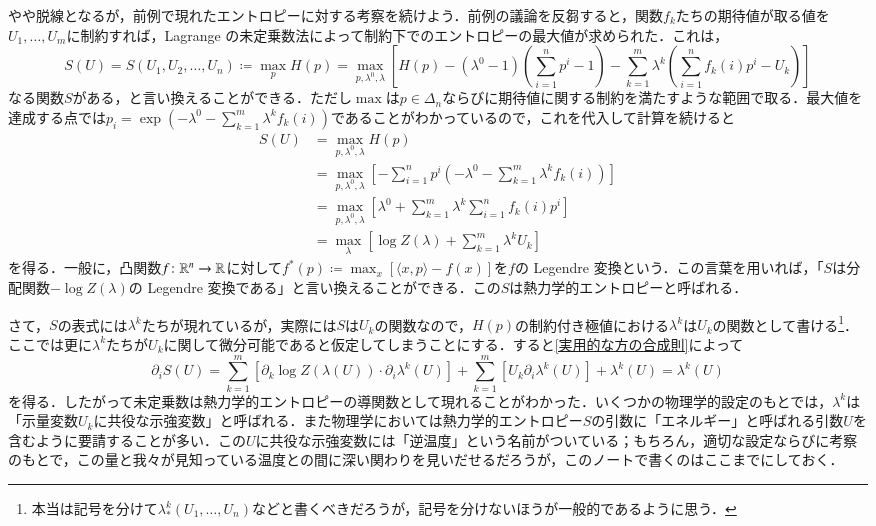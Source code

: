 \begin{exm}
やや脱線となるが，前例で現れたエントロピーに対する考察を続けよう．前例の議論を反芻すると，関数$f_k$たちの期待値が取る値を$U_1, \dots, U_m$に制約すれば，Lagrange の未定乗数法によって制約下でのエントロピーの最大値が求められた．これは，
\begin{equation}
S(U) = S(U_1, U_2, \dots, U_n) \coloneqq \max_{p} H(p) = \max_{p, \lambda^0, \lambda} \left[H(p) - (\lambda^0-1) \left(\sum_{i=1}^n p^i - 1\right) - \sum_{k=1}^m \lambda^k \left(\sum_{i=1}^n f_k(i) p^i - U_k\right) \right]
\end{equation}なる関数$S$がある，と言い換えることができる．ただし$\max$は$p\in \Delta_n$ならびに期待値に関する制約を満たすような範囲で取る．最大値を達成する点では$p_i = \exp\left(- \lambda^0 - \sum_{k=1}^m \lambda^k f_k(i) \right)$であることがわかっているので，これを代入して計算を続けると
\begin{align}
S(U) &= \max_{p,\lambda^0,\lambda} H(p) \\
&= \max_{p, \lambda^0, \lambda} \left[ -\sum_{i=1}^n p^i \left(-\lambda^0 - \sum_{k=1}^m \lambda^k f_k(i) \right) \right] \\
&= \max_{p, \lambda^0, \lambda} \left[ \lambda^0 + \sum_{k=1}^m \lambda^k \sum_{i=1}^n f_k(i)p^i  \right] \\
&= \max_{\lambda} \left[ \log Z(\lambda) + \sum_{k=1}^m \lambda^k  U_k  \right]
\end{align}を得る．一般に，凸関数$f \colon \mathbb{R}^n \to \mathbb{R}$に対して$f^*(p) \coloneqq \max_x \left[ \langle x,p \rangle - f(x) \right]$を$f$の Legendre 変換という．この言葉を用いれば，「$S$は分配関数$-\log Z(\lambda)$の Legendre 変換である」と言い換えることができる．この$S$は熱力学的エントロピーと呼ばれる．

さて，$S$の表式には$\lambda^k$たちが現れているが，実際には$S$は$U_k$の関数なので，$H(p)$の制約付き極値における$\lambda^k$は$U_k$の関数として書ける\footnote{本当は記号を分けて$\lambda^k_*(U_1,\dots,U_n)$などと書くべきだろうが，記号を分けないほうが一般的であるように思う．}．ここでは更に$\lambda^k$たちが$U_k$に関して微分可能であると仮定してしまうことにする．すると\cref{実用的な方の合成則}によって
\begin{equation}
\partial_i S(U) = \sum_{k=1}^m \left[ \partial_k \log Z(\lambda(U)) \cdot \partial_i \lambda^k (U) \right] + \sum_{k=1}^m \left[U_k \partial_i \lambda^k(U) \right] + \lambda^k(U) = \lambda^k(U)
\end{equation}を得る．したがって未定乗数は熱力学的エントロピーの導関数として現れることがわかった．いくつかの物理学的設定のもとでは，$\lambda^k$は「示量変数$U_k$に共役な示強変数」と呼ばれる．また物理学においては熱力学的エントロピー$S$の引数に「エネルギー」と呼ばれる引数$U$を含むように要請することが多い．この$U$に共役な示強変数には「逆温度」という名前がついている；もちろん，適切な設定ならびに考察のもとで，この量と我々が見知っている温度との間に深い関わりを見いだせるだろうが，このノートで書くのはここまでにしておく．
\end{exm}

